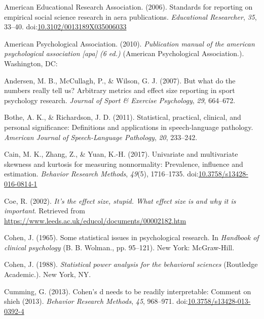\documentclass[
  man,floatsintext]{apa6}
\begin{document}
\leavevmode\hypertarget{ref-AERA_2006}{}%
American Educational Research Association. (2006). Standards for reporting on empirical social science research in aera publications. \emph{Educational Researcher}, \emph{35}, 33--40. doi:\href{https://doi.org/10.3102/0013189X035006033}{10.3102/0013189X035006033}

\leavevmode\hypertarget{ref-APA_2010}{}%
American Psychological Association. (2010). \emph{Publication manual of the american psychological association {[}apa{]} (6 ed.)} (American Psychological Association.). Washington, DC:

\leavevmode\hypertarget{ref-Andersen_et_al_2007}{}%
Andersen, M. B., McCullagh, P., \& Wilson, G. J. (2007). But what do the numbers really tell us? Arbitrary metrics and effect size reporting in sport psychology research. \emph{Journal of Sport \& Exercise Psychology}, \emph{29}, 664--672.

\leavevmode\hypertarget{ref-Bothe_Richardson_2011}{}%
Bothe, A. K., \& Richardson, J. D. (2011). Statistical, practical, clinical, and personal significance: Definitions and applications in speech-language pathology. \emph{American Journal of Speech-Language Pathology}, \emph{20}, 233--242.

\leavevmode\hypertarget{ref-Cain_et_al_2017}{}%
Cain, M. K., Zhang, Z., \& Yuan, K.-H. (2017). Univariate and multivariate skewness and kurtosis for measuring nonnormality: Prevalence, influence and estimation. \emph{Behavior Research Methods}, \emph{49}(5), 1716--1735. doi:\href{https://doi.org/10.3758/s13428-016-0814-1}{10.3758/s13428-016-0814-1}

\leavevmode\hypertarget{ref-Coe_2002}{}%
Coe, R. (2002). \emph{It's the effect size, stupid. What effect size is and why it is important}. Retrieved from \url{https://www.leeds.ac.uk/educol/documents/00002182.htm}

\leavevmode\hypertarget{ref-Cohen_1965}{}%
Cohen, J. (1965). Some statistical issues in psychological research. In \emph{Handbook of clinical psychology} (B. B. Wolman., pp. 95--121). New York: McGraw-Hill.

\leavevmode\hypertarget{ref-Cohen_1988}{}%
Cohen, J. (1988). \emph{Statistical power analysis for the behavioral sciences} (Routledge Academic.). New York, NY.

\leavevmode\hypertarget{ref-Cumming_2013}{}%
Cumming, G. (2013). Cohen's d needs to be readily interpretable: Comment on shieh (2013). \emph{Behavior Research Methods}, \emph{45}, 968--971. doi:\href{https://doi.org/10.3758/s13428-013-0392-4}{10.3758/s13428-013-0392-4}
\end{document}
